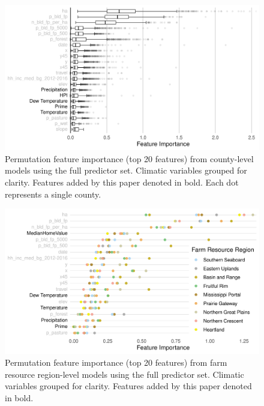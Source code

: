 \documentclass[12pt]{article}
\begin{document}
\begin{figure}[H]
    \centering
    \includegraphics[width=1\textwidth]{exhibits/fcb_importance_t20.png}
    \caption{Permutation feature importance (top 20 features) from county-level models using the full predictor set. Climatic variables grouped for clarity. Features added by this paper denoted in bold. Each dot represents a single county.}
    \label{fig:fcb_importance}
\end{figure}

\begin{figure}[H]
    \centering
    \includegraphics[width=1\textwidth]{exhibits/ffb_importance_t20.png}
    \caption{Permutation feature importance (top 20 features) from farm resource region-level models using the full predictor set. Climatic variables grouped for clarity. Features added by this paper denoted in bold.}
    \label{fig:ffb_importance}
\end{figure}
\end{document}
